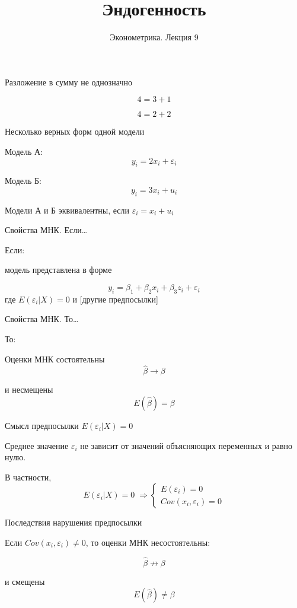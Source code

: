 \documentclass[ignorenonframetext,]{beamer}
\author[Эконометрика. Лекция 9]{Эконометрика. Лекция 9}
\title{Эндогенность}
\date{}
\begin{document}
\frame{\titlepage}

\begin{frame}{Разложение в сумму не однозначно}

\[
4 = 3 + 1
\]

\[
4 = 2 + 2
\]

\end{frame}

\begin{frame}{Несколько верных форм одной модели}

Модель А: \[
y_i=2x_i + \varepsilon_i
\]

Модель Б: \[
y_i=3x_i + u_i
\]

Модели А и Б эквивалентны, если \(\varepsilon_i=x_i+u_i\)

\end{frame}

\begin{frame}{Свойства МНК. Если\ldots{}}

Если:

модель представлена в форме

\[
y_i=\beta_1 + \beta_2 x_i + \beta_3 z_i + \varepsilon_i
\] где \(E(\varepsilon_i | X)=0\) и {[}другие предпосылки{]}

\end{frame}

\begin{frame}{Свойства МНК. То\ldots{}}

То:

Оценки МНК состоятельны \[
\hat{\beta} \to \beta
\]

и несмещены \[
E(\hat{\beta})=\beta
\]

\end{frame}

\begin{frame}{Смысл предпосылки \(E(\varepsilon_i | X)=0\)}

Среднее значение \(\varepsilon_i\) не зависит от значений объясняющих
переменных и равно нулю.

В частности, \[
E(\varepsilon_i | X)=0   \; \Rightarrow 
\begin{cases}
E(\varepsilon_i)=0 \\ 
Cov(x_i,\varepsilon_i)=0
\end{cases}
\]

\end{frame}

\begin{frame}{Последствия нарушения предпосылки}

Если \(Cov(x_i, \varepsilon_i) \neq 0\), то оценки МНК несостоятельны:

\[
\hat{\beta} \not \to \beta
\]

и смещены \[
E(\hat{\beta}) \neq \beta
\]

\end{frame}
\end{document}
